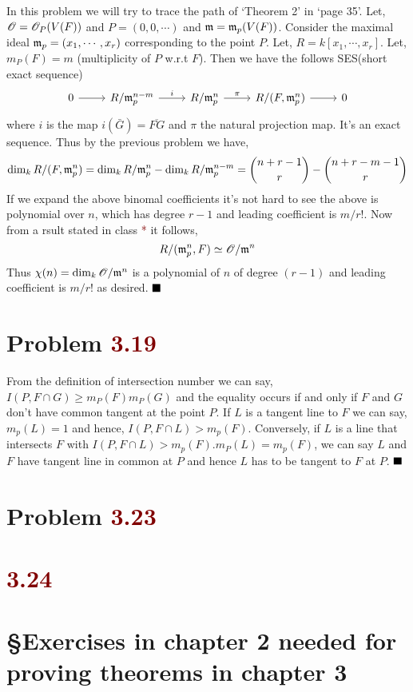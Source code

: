 \documentclass[12pt]{article}
\begin{document}
In this problem we will try to trace the path of `Theorem 2' in `page 35'. Let, $\mathscr{O} = \mathscr{O}_P(V(F))$ and $P=(0,0,\cdots)$ and $\mathfrak{m} = \mathfrak{m}_p(V(F))$. Consider the maximal ideal $\mathfrak{m}_p=(x_1,\cdots,x_r)$ corresponding to the point $P$. Let, $R = k[x_1,\cdots,x_r]$. Let, $m_P(F)=m$ (multiplicity of $P$ w.r.t $F$). Then we have the follows SES(short exact sequence) \[\begin{tikzcd}
    0 & {R/\m_p^{n-m}} & {R/\m_p^n} & {R/(F,\m_p^n)} & 0
    \arrow[from=1-1, to=1-2]
    \arrow["i", from=1-2, to=1-3]
    \arrow["\pi", from=1-3, to=1-4]
    \arrow[from=1-4, to=1-5]
    \end{tikzcd}\]
where $i$ is the map $i(\bar{G})=\overline{FG}$ and $\pi$ the natural projection map. It's an exact sequence. Thus by the previous problem we have, $$\dim_k R/(F,\mathfrak{m}_p^n) = \dim_k R/\mathfrak{m}_p^n - \dim_k R/\mathfrak{m}_p^{n-m}= \binom{n+r-1}{r}-\binom{n+r-m-1}{r}$$ If we expand the above binomal coefficients it's not hard to see the above is polynomial over $n$, which has degree $r-1$ and leading coefficient is $m/r!$. Now from a rsult stated in class \textcolor{maroon}{*} it follows, $$R/(\mathfrak{m}_p^n,F) \simeq \mathscr{O}/\mathfrak{m}^n$$ Thus $\chi(n) = \dim_k \mathscr{O}/\mathfrak{m}^n$ is a polynomial of $n$ of degree $(r-1)$ and leading coefficient is $m/r!$ as desired. $\hfill \blacksquare$

\section{Problem \textcolor{maroon}{3.19}}
From the definition of intersection number we can say, $I(P,F\cap G) \geq m_P(F)m_P(G)$ and the equality occurs if and only if $F$ and $G$ don't have common tangent at the point $P$. If $L$ is a tangent line to $F$ we can say, $m_p(L)=1$ and hence, $I(P,F \cap L) >m_p(F)$. Conversely, if $L$ is a line that intersects $F$ with $I(P,F\cap L)>m_p(F).m_P(L)=m_p(F)$, we can say $L$ and $F$ have tangent line in common at $P$ and hence $L$ has to be tangent to $F$ at $P$. $\hfill \blacksquare$
\section{Problem \textcolor{maroon}{3.23}}%

\section{\textcolor{maroon}{3.24}} 

\pagebreak

\section*{\S Exercises in chapter 2 needed for proving theorems in chapter 3}
\end{document}
